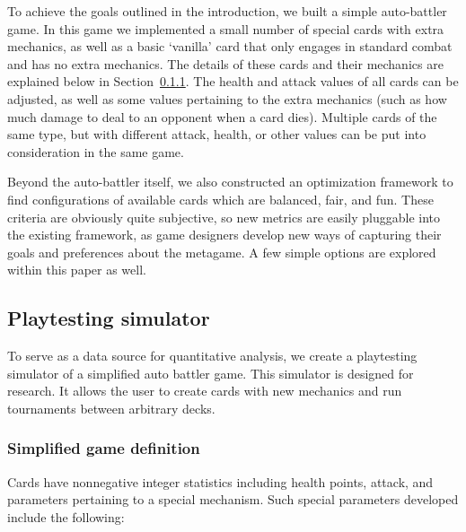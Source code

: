 
To achieve the goals outlined in the introduction, we built a simple auto-battler game. In this game we implemented a small number of special cards with extra mechanics, as well as a basic `vanilla' card that only engages in standard combat and has no extra mechanics. The details of these cards and their mechanics are explained below in Section~\ref{sec:ab-game-def}. The health and attack values of all cards can be adjusted, as well as some values pertaining to the extra mechanics (such as how much damage to deal to an opponent when a card dies). Multiple cards of the same type, but with different attack, health, or other values can be put into consideration in the same game. 

Beyond the auto-battler itself, we also constructed an optimization framework to find configurations of available cards which are balanced, fair, and fun. These criteria are obviously quite subjective, so new metrics are easily pluggable into the existing framework, as game designers develop new ways of capturing their goals and preferences about the metagame. A few simple options are explored within this paper as well.

\subsection{Playtesting simulator} \label{sec:sim}

To serve as a data source for quantitative analysis, we create
a playtesting simulator of a simplified auto battler game. 
This simulator is designed for research. It allows the user to 
create cards with new mechanics and run tournaments between
arbitrary decks. 

\subsubsection{Simplified game definition} \label{sec:ab-game-def}

Cards have nonnegative integer statistics including health points, 
attack, and parameters pertaining to a special mechanism. Such special parameters
developed include the following:


